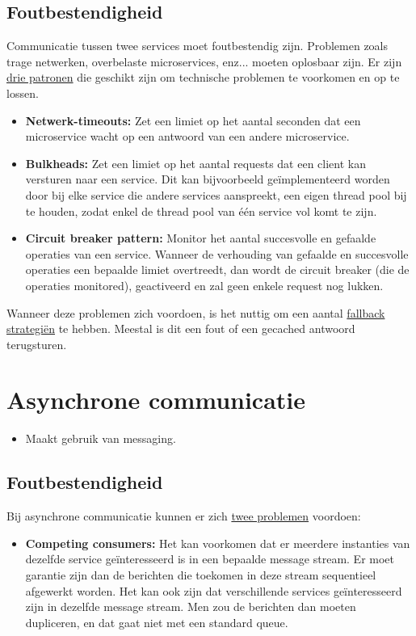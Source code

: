 	\subsection{Foutbestendigheid}
	Communicatie tussen twee services moet foutbestendig zijn. Problemen zoals trage netwerken, overbelaste microservices, enz... moeten oplosbaar zijn. Er zijn \underline{drie patronen} die geschikt zijn om technische problemen te voorkomen en op te lossen.
	\begin{itemize}
		\item[\info] \textbf{Netwerk-timeouts:} Zet een limiet op het aantal seconden dat een microservice wacht op een antwoord van een andere microservice.
		\item[\info] \textbf{Bulkheads:} Zet een limiet op het aantal requests dat een client kan versturen naar een service. Dit kan bijvoorbeeld geïmplementeerd worden door bij elke service die andere services aanspreekt, een eigen thread pool bij te houden, zodat enkel de thread pool van één service vol komt te zijn.
		\item[\info] \textbf{Circuit breaker pattern:} Monitor het aantal succesvolle en gefaalde operaties van een service. Wanneer de verhouding van gefaalde en succesvolle operaties een bepaalde limiet overtreedt, dan wordt de circuit breaker (die de operaties monitored), geactiveerd en zal geen enkele request nog lukken.
	\end{itemize}
	Wanneer deze problemen zich voordoen, is het nuttig om een aantal \underline{fallback strategiën} te hebben. Meestal is dit een fout of een gecached antwoord terugsturen.
	\section{Asynchrone communicatie}
	\begin{itemize}
		\item[\info] Maakt gebruik van messaging.

	\end{itemize}
	\subsection{Foutbestendigheid}
	Bij asynchrone communicatie kunnen er zich \underline{twee problemen} voordoen:
	\begin{itemize}
		\item[\info] \textbf{Competing consumers:} Het kan voorkomen dat er meerdere instanties van dezelfde service geïnteresseerd is in een bepaalde message stream. Er moet garantie zijn dan de berichten die toekomen in deze stream sequentieel afgewerkt worden. Het kan ook zijn dat verschillende services geïnteresseerd zijn in dezelfde message stream. Men zou de berichten dan moeten dupliceren, en dat gaat niet met een standard queue.
	\end{itemize}

